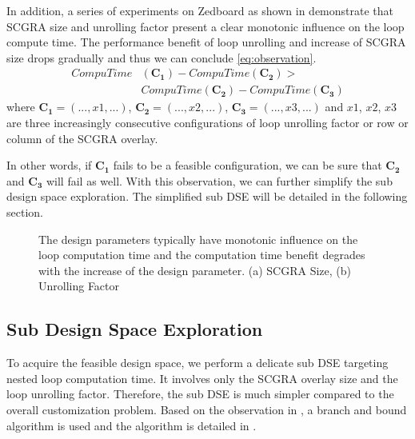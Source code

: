 In addition, a series of experiments on Zedboard \cite{zedboard} as 
shown in  demonstrate that SCGRA size and 
unrolling factor present a clear monotonic influence on the 
loop compute time. The performance benefit of loop unrolling and 
increase of SCGRA size drops gradually and thus we can conclude \eqref{eq:observation}.
\begin{equation} \label{eq:observation}
    \begin{split}
        CompuTime&(\bm{C_1})-CompuTime(\bm{C_2}) > \\
                 &CompuTime(\bm{C_2})-CompuTime(\bm{C_3})
    \end{split}
\end{equation}
where $\bm{C_1}=(...,x1,...)$, $\bm{C_2}=(...,x2,...)$, $\bm{C_3}=(...,x3,...)$ and
$x1$, $x2$, $x3$ are three increasingly consecutive configurations of loop unrolling 
factor or row or column of the SCGRA overlay.

In other words, if $\bm{C_1}$ fails to be a feasible configuration, we can be 
sure that $\bm{C_2}$ and $\bm{C_3}$ will fail as well. With this observation, 
we can further simplify the sub design space exploration. The simplified sub DSE will be 
detailed in the following section.

\begin{figure}[H]
    \caption{The design parameters typically have monotonic influence on the
        loop computation time and the computation time benefit degrades with 
        the increase of the design parameter. (a) SCGRA Size, (b) Unrolling Factor}
    \label{fig:observation}
  \end{figure}


\subsection{Sub Design Space Exploration}
To acquire the feasible design space, we perform a delicate sub DSE 
targeting nested loop computation time. It involves only the SCGRA overlay 
size and the loop unrolling factor. Therefore, the sub DSE is much simpler 
compared to the overall customization problem. Based on the 
observation in , a branch and bound algorithm 
is used and the algorithm is detailed in . 

